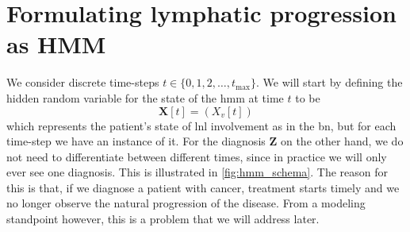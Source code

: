 \documentclass[\relativeRoot/main.tex]{subfiles}
\begin{document}
\section{Formulating lymphatic progression as HMM}
\label{sec:unilateral:formulation}

We consider discrete time-steps $t \in \{ 0, 1, 2, \ldots, t_\text{max} \}$. We will start by defining the hidden random variable for the state of the \gls{hmm} at time $t$ to be
%
\begin{equation}
    \mathbf{X}[t] = \left( X_v[t] \right)
\end{equation}
%
which represents the patient’s state of \gls{lnl} involvement as in the \gls{bn}, but for each time-step we have an instance of it. For the diagnosis $\mathbf{Z}$ on the other hand, we do not need to differentiate between different times, since in practice we will only ever see one diagnosis. This is illustrated in \cref{fig:hmm_schema}. The reason for this is that, if we diagnose a patient with cancer, treatment starts timely and we no longer observe the natural progression of the disease. From a modeling standpoint however, this is a problem that we will address later.
\end{document}
